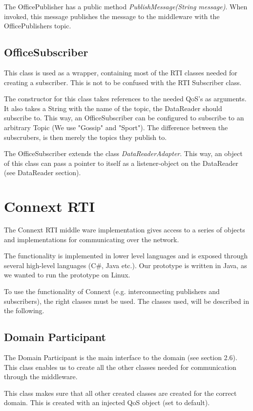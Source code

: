 The OfficePublisher has a public method \textit{PublishMessage(String message)}. When invoked, this message publishes the message to the middleware with the OfficePublishers topic. 

\subsection{OfficeSubscriber}
This class is used as a wrapper, containing most of the RTI classes needed for creating a subscriber. This is not to be confused with the RTI Subscriber class.

The constructor for this class takes references to the needed QoS's as arguments. It also takes a String with the name of the topic, the DataReader should subscribe to. This way, an OfficeSubscriber can be configured to subscribe to an arbitrary Topic (We use "Gossip" and "Sport"). The difference between the subscrubers, is then merely the topics they publish to.

The OfficeSubscriber extends the class \textit{DataReaderAdapter}. This way, an object of this class can pass a pointer to itself as a listener-object on the DataReader (see DataReader section).

\section{Connext RTI}
The Connext RTI middle ware implementation gives access to a series of objects and implementations for communicating over the network.

The functionality is implemented in lower level languages and is exposed through several high-level languages (C\#, Java etc.). Our prototype is written in Java, as we wanted to run the prototype on Linux. 

To use the functionality of Connext (e.g. interconnecting publishers and subscribers), the right classes must be used. The classes used, will be described in the following. 

\subsection{Domain Participant}
The Domain Participant is the main interface to the domain (see section 2.6). This class enables us to create all the other classes needed for communication through the middleware.

This class makes sure that all other created classes are created for the correct domain. This is created with an injected QoS object (set to default).

